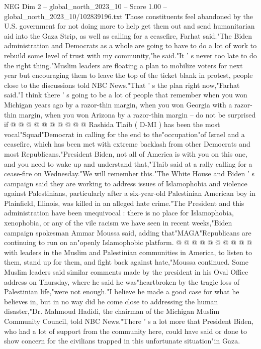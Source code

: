 \begin{textsample}{NEG Dim 2 – global\_north\_2023\_10 – Score 1.00 – global\_north\_2023\_10/102839196.txt}
Those constituents feel abandoned by the U.S. government for not doing more to help get them out and send humanitarian aid into the Gaza Strip, as well as calling for a ceasefire, Farhat said."The Biden administration and Democrats as a whole are going to have to do a lot of work to rebuild some level of trust with my community,"he said."It ' s never too late to do the right thing."Muslim leaders are floating a plan to mobilize voters for next year but encouraging them to leave the top of the ticket blank in protest, people close to the discussions told NBC News."That ' s the plan right now,"Farhat said."I think there ' s going to be a lot of people that remember when you won Michigan years ago by a razor-thin margin, when you won Georgia with a razor-thin margin, when you won Arizona by a razor-thin margin -- do not be surprised if @ @ @ @ @ @ @ @ @ @ Rashida Tlaib ( D-MI ) has been the most vocal"Squad"Democrat in calling for the end to the"occupation"of Israel and a ceasefire, which has been met with extreme backlash from other Democrats and most Republicans."President Biden, not all of America is with you on this one, and you need to wake up and understand that,"Tlaib said at a rally calling for a cease-fire on Wednesday."We will remember this."The White House and Biden ' s campaign said they are working to address issues of Islamophobia and violence against Palestinians, particularly after a six-year-old Palestinian American boy in Plainfield, Illinois, was killed in an alleged hate crime."The President and this administration have been unequivocal : there is no place for Islamophobia, xenophobia, or any of the vile racism we have seen in recent weeks,"Biden campaign spokesman Ammar Moussa said, adding that"MAGA"Republicans are continuing to run on an"openly Islamophobic platform. @ @ @ @ @ @ @ @ @ @ with leaders in the Muslim and Palestinian communities in America, to listen to them, stand up for them, and fight back against hate,"Moussa continued.
Some Muslim leaders said similar comments made by the president in his Oval Office address on Thursday, where he said he was"heartbroken by the tragic loss of Palestinian life,"were not enough."I believe he made a good case for what he believes in, but in no way did he come close to addressing the human disaster,"Dr.
Mahmoud Hadidi, the chairman of the Michigan Muslim Community Council, told NBC News."There ' s a lot more that President Biden, who had a lot of support from the community here, could have said or done to show concern for the civilians trapped in this unfortunate situation"in Gaza.

\end{textsample}

